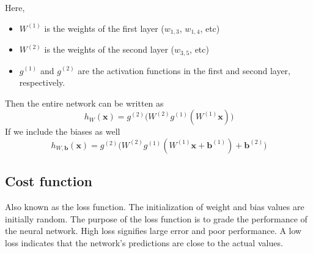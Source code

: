 \documentclass[11pt]{article}
\begin{document}
Here, 
\begin{itemize}
    \item $W^{(1)}$ is the weights of the first layer ($w_{1,3}$, $w_{1,4}$, etc)
    \item $W^{(2)}$ is the weights of the second layer ($w_{3,5}$, etc)
    \item $g^{(1)}$ and $g^{(2)}$ are the activation functions in the first and second layer, respectively.
\end{itemize}
Then the entire network can be written as 
$$
h_{W}(\mathbf{x})=g^{(2)}\big(W^{(2)}g^{(1)}(W^{(1)}\mathbf{x})\big)
$$
If we include the biases as well
$$
\boxed{h_{W,\mathbf{b}}(\mathbf{x})=g^{(2)}\big(W^{(2)}g^{(1)}(W^{(1)}\mathbf{x}+\mathbf{b}^{(1)})+\mathbf{b}^{(2)}\big)}
$$

\subsection{Cost function}
Also known as the loss function. The initialization of weight and bias values are initially random.
The purpose of the loss function is to grade the performance of the neural network. High loss signifies large error and poor performance.
A low loss indicates that the network's predictions are close to the actual values.
\end{document}
